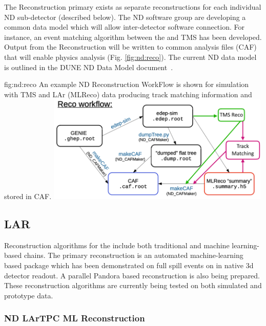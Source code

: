 \documentclass[../main-v1.tex]{subfiles}
\begin{document}
The  Reconstruction primary exists as separate reconstructions for each individual ND sub-detector (described below). The ND software group are developing a common data model which will allow inter-detector software connection. For instance, an event matching algorithm between the  and TMS has been developed. Output from the Reconstruction will be written to common analysis files (CAF) that will enable physics analysis (Fig. \ref{fig:nd:reco}). The current ND data model is outlined in the DUNE ND Data Model document~\cite{bib:docdb24735}.

\begin{dunefigure}
{fig:nd:reco}
{An example ND Reconstruction WorkFlow is shown for simulation with TMS and LAr (MLReco) data producing track matching information and stored in CAF.}
{\includegraphics[width=0.8\textwidth]{graphics/ND/ND-Reco-workflow.png}}
\end{dunefigure}

\subsection{LAR}
 Reconstruction algorithms for the  include both traditional and machine learning-based chains. The primary reconstruction is an automated machine-learning based package which has been demonstrated on full spill events on in native 3d detector readout. A parallel Pandora based reconstruction is also being prepared. These reconstruction algorithms are currently being tested on both simulated and prototype data. 
 
\subsubsection{ND LArTPC ML Reconstruction }
\end{document}
